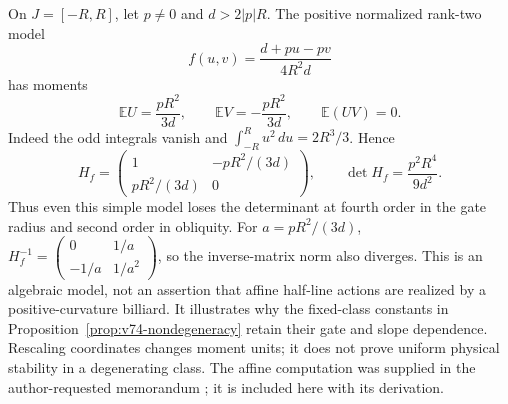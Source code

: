 \begin{remark}\label{rem:v75-conditioning}
On $J=[-R,R]$, let $p\ne0$ and $d>2|p|R$.  The positive normalized
rank-two model
\[
 f(u,v)=\frac{d+pu-pv}{4R^2d}
\]
has moments
\[
 \mathbb E U=\frac{pR^2}{3d},\qquad
 \mathbb E V=-\frac{pR^2}{3d},\qquad \mathbb E(UV)=0.
\]
Indeed the odd integrals vanish and
$\int_{-R}^R u^2\,du=2R^3/3$.  Hence
\begin{equation}\label{eq:v75-affine-determinant}
 H_f=\begin{pmatrix}1&-pR^2/(3d)\\pR^2/(3d)&0\end{pmatrix},
 \qquad \det H_f=\frac{p^2R^4}{9d^2}.
\end{equation}
Thus even this simple model loses the determinant at fourth order in the
gate radius and second order in obliquity.  For $a=pR^2/(3d)$,
$H_f^{-1}=\left(\begin{smallmatrix}0&1/a\\-1/a&1/a^2\end{smallmatrix}\right)$,
so the inverse-matrix norm also diverges.  This is an algebraic model,
not an assertion that affine half-line actions are realized by a
positive-curvature billiard.  It illustrates why the fixed-class
constants in Proposition~\ref{prop:v74-nondegeneracy} retain their
gate and slope dependence.  Rescaling coordinates changes moment units;
it does not prove uniform physical stability in a degenerating class.
The affine computation was supplied in the author-requested memorandum
\cite{A2ReviewV74}; it is included here with its derivation.
\end{remark}
